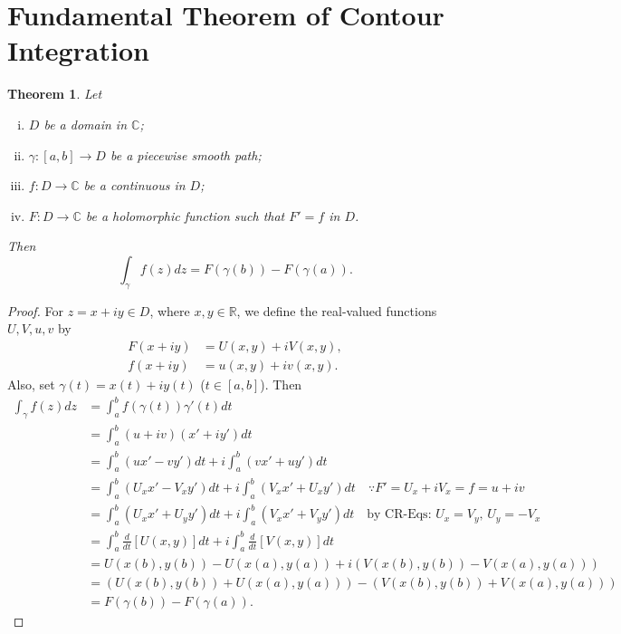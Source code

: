\documentclass[12pt,openany]{book}
\newtheorem{theorem}{Theorem}[chapter]
\theoremstyle{definition}
\newcommand{\R}{\mathbb{R}}
\newcommand{\C}{\mathbb{C}}
\newcommand{\of}[1]{\left( #1 \right)}
\begin{document}
	\section{Fundamental Theorem of Contour Integration}
	
	\begin{tcolorbox}[colback=white,colframe=thmcolor,arc=5pt,title={\color{white}\bf Fundamental Theorem of Contour Integration}]
		\begin{theorem}
			Let \begin{enumerate}[(i)]
				\item $D$ be a domain in $\C$;
				\item $\gamma:[a,b]\to D$ be a piecewise smooth path;
				\item $f:D\to\C$ be a continuous in $D$;
				\item $F:D\to\C$ be a holomorphic function such that $F'=f$ in $D$.
			\end{enumerate} Then \[
			\int_\gamma f\of{z}dz=F\of{\gamma\of{b}}-F\of{\gamma\of{a}}.
			\]
		\end{theorem}
	\end{tcolorbox}
	\begin{proof}
		For $z=x+iy\in D$, where $x,y\in\R$, we define the real-valued functions $U,V,u,v$ by \begin{align*}
		F(x+iy)&=U(x,y)+iV(x,y),\\
		f(x+iy)&=u(x,y)+iv(x,y).
		\end{align*} Also, set $\gamma\of{t}=x\of{t}+iy\of{t}$ ($t\in[a,b]$). Then
		\begin{align*}
		\int_\gamma f\of{z}dz&=\int_a^bf\of{\gamma\of{t}}\gamma'\of{t}dt\\
		&=\int_a^b\of{u+iv}\of{x'+iy'}dt\\
		&=\int_a^b\of{ux'-vy'}dt +i\int_a^b\of{vx'+uy'}dt\\
		&=\int_a^b\of{U_xx'-V_xy'}dt +i\int_a^b\of{V_xx'+U_xy'}dt\quad\because F'=U_x+iV_x=f=u+iv\\
		&=\int_a^b\of{U_xx'+U_yy'}dt +i\int_a^b\of{V_xx'+V_yy'}dt\quad\text{by CR-Eqs: $U_x=V_y$, $U_y=-V_x$}\\
		&=\int_a^b\frac{d}{dt}\left[U(x,y)\right]dt+i\int_a^b\frac{d}{dt}\left[V(x,y)\right]dt\\
		&=U\of{x(b),y(b)}-U\of{x(a),y(a)}+i\of{V\of{x(b),y(b)}-V\of{x(a),y(a)}}\\
		&=\of{U\of{x(b),y(b)}+U\of{x(a),y(a)}}-\of{V\of{x(b),y(b)}+V\of{x(a),y(a)}}\\
		&=F\of{\gamma\of{b}}-F\of{\gamma\of{a}}.
		\end{align*}
	\end{proof}
	
\end{document}
